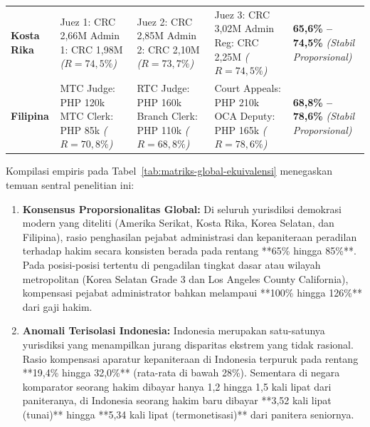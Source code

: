 \documentclass[12pt, a4paper]{article}
\begin{document}
\begin{table}[H]
\begin{tabular}{p{2.1cm} p{3.3cm} p{3.3cm} p{3.3cm} p{1.8cm}}
\raggedright\textbf{Kosta Rika} & Juez 1: CRC 2,66M \newline Admin 1: CRC 1,98M \newline \textit{($R = 74,5\%$)} & Juez 2: CRC 2,85M \newline Admin 2: CRC 2,10M \newline \textit{($R = 73,7\%$)} & Juez 3: CRC 3,02M \newline Admin Reg: CRC 2,25M \newline \textit{($R = 74,5\%$)} & \textbf{65,6\% -- 74,5\%} \newline \textit{(Stabil Proporsional)} \tabularnewline
\raggedright\textbf{Filipina} & MTC Judge: PHP 120k \newline MTC Clerk: PHP 85k \newline \textit{($R = 70,8\%$)} & RTC Judge: PHP 160k \newline Branch Clerk: PHP 110k \newline \textit{($R = 68,8\%$)} & Court Appeals: PHP 210k \newline OCA Deputy: PHP 165k \newline \textit{($R = 78,6\%$)} & \textbf{68,8\% -- 78,6\%} \newline \textit{(Stabil Proporsional)} \tabularnewline
\hline
\end{tabular}
\end{table}

Kompilasi empiris pada Tabel~\ref{tab:matriks-global-ekuivalensi} menegaskan temuan sentral penelitian ini:
\begin{enumerate}
    \item \textbf{Konsensus Proporsionalitas Global:} Di seluruh yurisdiksi demokrasi modern yang diteliti (Amerika Serikat, Kosta Rika, Korea Selatan, dan Filipina), rasio penghasilan pejabat administrasi dan kepaniteraan peradilan terhadap hakim secara konsisten berada pada rentang **65\% hingga 85\%**. Pada posisi-posisi tertentu di pengadilan tingkat dasar atau wilayah metropolitan (Korea Selatan Grade 3 dan Los Angeles County California), kompensasi pejabat administrator bahkan melampaui **100\% hingga 126\%** dari gaji hakim.
    \item \textbf{Anomali Terisolasi Indonesia:} Indonesia merupakan satu-satunya yurisdiksi yang menampilkan jurang disparitas ekstrem yang tidak rasional. Rasio kompensasi aparatur kepaniteraan di Indonesia terpuruk pada rentang **19,4\% hingga 32,0\%** (rata-rata di bawah 28\%). Sementara di negara komparator seorang hakim dibayar hanya 1,2 hingga 1,5 kali lipat dari paniteranya, di Indonesia seorang hakim baru dibayar **3,52 kali lipat (tunai)** hingga **5,34 kali lipat (termonetisasi)** dari panitera seniornya.
\end{enumerate}
\end{document}
